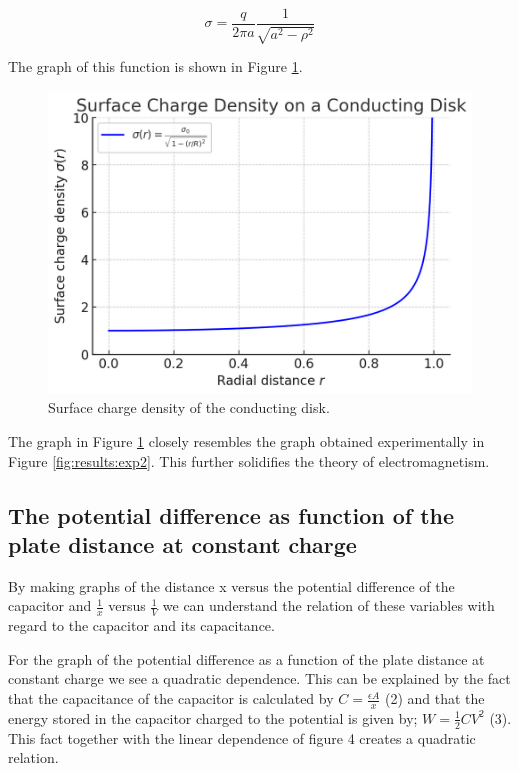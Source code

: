 \begin{equation*}
    \sigma = \frac{q}{2\pi a} \frac{1}{\sqrt{a^2 - \rho^2}}
\end{equation*}

The graph of this function is shown in Figure \ref{fig:discussion:jackson}.

\begin{figure}[H]
    \centering
    \includegraphics[width=0.8\linewidth]{capacitors/img/conducting_disk.png}
    \caption{Surface charge density of the conducting disk.}
    \label{fig:discussion:jackson}
\end{figure}

The graph in Figure \ref{fig:discussion:jackson} closely resembles the graph obtained experimentally in Figure \ref{fig:results:exp2}. This further solidifies the theory of electromagnetism. 
 

\subsection{The potential difference as function of the plate distance at constant charge}
By making graphs of the distance x versus the potential difference of the capacitor and $\frac{1}{x}$ versus $\frac{1}{V}$ we can understand the relation of these variables with regard to the capacitor and its capacitance.


For the graph of the potential difference as a function of the plate distance at constant charge we see a quadratic dependence. This can be explained by the fact that the capacitance of the capacitor is calculated by $C=\frac{\epsilon A}{x}$ (2) and that the energy stored in the capacitor charged to the potential is given by; $W=\frac{1}{2}CV^2$ (3). This fact together with the linear dependence of figure 4 creates a quadratic relation.

